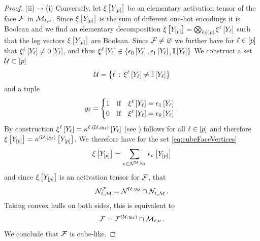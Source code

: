 \begin{proof}
    (ii)$\rightarrow$(i)
    Conversely, let $\xi\left[Y_{[p]}\right]$ be an elementary activation tensor of the face $\mathcal{F}$ in $\mathcal{M}_{t,\nu}$.
    Since $\xi\left[Y_{[p]}\right]$ is the sum of different one-hot encodings it is Boolean and we find an elementary decomposition $\xi\left[Y_{[p]}\right]=\bigotimes_{\ell\in[p]}\xi^{\ell}\left[Y_{\ell}\right]$ such that the leg vectors $\xi\left[Y_{[p]}\right]$ are Boolean.
    Since $\mathcal{F}\neq\varnothing$ we further have for $\ell\in[p]$ that $\xi^{\ell}\left[Y_{\ell}\right]\neq0\left[Y_{\ell}\right]$, and thus $\xi^{\ell}\left[Y_{\ell}\right]\in \{\epsilon_{0}\left[Y_{\ell}\right],\epsilon_{1}\left[Y_{\ell}\right],\mathbb{I}\left[Y_{\ell}\right]\}$
    We construct a set $\mathcal{U}\subset[p]$
    \begin{align*}
        \mathcal{U}
        = \left\{\ell \,:\, {\xi^{\ell}\left[Y_{\ell}\right]}\neq\mathbb{I}\left[Y_{\ell}\right]\right\}
    \end{align*}
    and a tuple
    \begin{align*}
        y_{\ell}
        = \begin{cases}
              1 & \text{if}\quad {\xi^{\ell}\left[Y_{\ell}\right]}=\epsilon_{1}\left[Y_{\ell}\right] \\
              0 & \text{if}\quad {\xi^{\ell}\left[Y_{\ell}\right]}=\epsilon_{0}\left[Y_{\ell}\right]
        \end{cases} \, .
    \end{align*}
    By construction ${\xi^{\ell}\left[Y_{\ell}\right]} = \kappa^{\ell,(\mathcal{U},y_{\mathcal{U}})}\left[Y_{\ell}\right]$ (see ) follows for all $\ell\in[p]$ and therefore $\xi\left[Y_{[p]}\right]=\kappa^{(\mathcal{U},y_{\mathcal{U}})}\left[Y_{[p]}\right]$.
    We therefore have for the set \eqref{eq:cubeFaceVertices}
    \begin{align*}
        \xi\left[Y_{[p]}\right]
        = \sum_{v\in\mathcal{N}_{}^{\mathcal{U},y_{\mathcal{U}}}} \epsilon_{v}\left[Y_{[p]}\right]
    \end{align*}
    and since $\xi\left[Y_{[p]}\right]$ is an activation tensor for $\mathcal{F}$, that
    \begin{align*}
        \mathcal{N}_{t,\mathcal{M}}^{\mathcal{F}}
        = \mathcal{N}_{}^{\mathcal{U},y_{\mathcal{U}}}\cap\mathcal{N}_{t,\mathcal{M}}^{} \, .
    \end{align*}
    Taking convex hulls on both sides, this is equivalent to
    \begin{align*}
        \mathcal{F}
        = \mathcal{F}^{(\mathcal{U},y_{\mathcal{U}})} \cap \mathcal{M}_{t,\nu} \, .
    \end{align*}
    We conclude that $\mathcal{F}$ is cube-like.
\end{proof}

